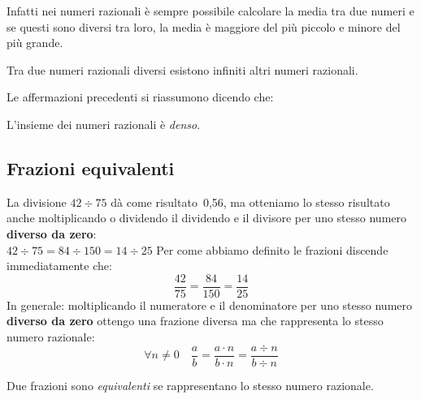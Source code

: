 Infatti nei numeri razionali è sempre possibile calcolare la media tra due
numeri e se questi sono diversi tra loro, la media è maggiore del più
piccolo e minore del più grande.

\begin{corollario}
 Tra due numeri razionali diversi esistono infiniti altri numeri razionali.
\end{corollario}

Le affermazioni precedenti si riassumono dicendo che:

\begin{definizione}
 L'insieme dei numeri razionali è \emph{denso}.
\end{definizione}

\subsection{Frazioni equivalenti}
\label{sub:razionali_equivalenti}

La divisione \(42 \div 75 \) dà come risultato~0,56, ma otteniamo lo stesso
risultato anche moltiplicando o dividendo il dividendo e il divisore per
uno stesso numero \textbf{diverso da zero}:\\
\(42 \div 75 = 84 \div 150 = 14 \div 25\)
Per come abbiamo definito le frazioni discende immediatamente che:\\
\[\dfrac{42}{75} = \dfrac{84}{150} = \dfrac{14}{25}\]
In generale: moltiplicando il numeratore e il denominatore per uno stesso
numero \textbf{diverso da zero} ottengo una frazione diversa ma che
rappresenta lo stesso numero razionale:
\[\forall n \neq 0 \quad \frac{a}{b} = \frac{a \cdot n}{b \cdot n} =
  \frac{a \div n}{b \div n}\]

\begin{definizione}
 Due frazioni sono \emph{equivalenti} se rappresentano lo stesso numero
razionale.
\end{definizione}


